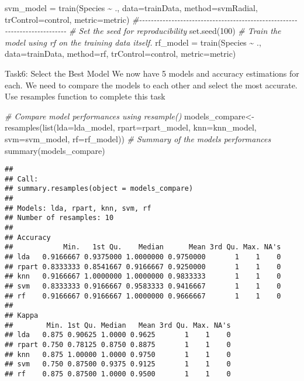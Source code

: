 \documentclass[
]{article}
\newenvironment{Shaded}{\begin{snugshade}}{\end{snugshade}}
\newcommand{\AttributeTok}[1]{\textcolor[rgb]{0.77,0.63,0.00}{#1}}
\newcommand{\CommentTok}[1]{\textcolor[rgb]{0.56,0.35,0.01}{\textit{#1}}}
\newcommand{\DecValTok}[1]{\textcolor[rgb]{0.00,0.00,0.81}{#1}}
\newcommand{\FunctionTok}[1]{\textcolor[rgb]{0.00,0.00,0.00}{#1}}
\newcommand{\NormalTok}[1]{#1}
\newcommand{\OtherTok}[1]{\textcolor[rgb]{0.56,0.35,0.01}{#1}}
\newcommand{\SpecialCharTok}[1]{\textcolor[rgb]{0.00,0.00,0.00}{#1}}
\newcommand{\StringTok}[1]{\textcolor[rgb]{0.31,0.60,0.02}{#1}}
\begin{document}
\begin{Shaded}
\begin{Highlighting}[]
\NormalTok{svm\_model }\OtherTok{=} \FunctionTok{train}\NormalTok{(Species }\SpecialCharTok{\textasciitilde{}}\NormalTok{ ., }\AttributeTok{data=}\NormalTok{trainData, }\AttributeTok{method=}\StringTok{\textquotesingle{}svmRadial\textquotesingle{}}\NormalTok{, }
\AttributeTok{trControl=}\NormalTok{control, }\AttributeTok{metric=}\NormalTok{metric)}
\CommentTok{\#{-}{-}{-}{-}{-}{-}{-}{-}{-}{-}{-}{-}{-}{-}{-}{-}{-}{-}{-}{-}{-}{-}{-}{-}{-}{-}{-}{-}{-}{-}{-}{-}{-}{-}{-}{-}{-}{-}{-}{-}{-}{-}{-}{-}{-}{-}{-}{-}{-}{-}{-}{-}{-}{-}{-}{-}{-}{-}{-}{-}{-}{-}{-}{-}{-}{-}{-}{-}{-}{-}{-}{-}{-}{-}{-}}
\CommentTok{\# Set the seed for reproducibility}
\FunctionTok{set.seed}\NormalTok{(}\DecValTok{100}\NormalTok{)}
\CommentTok{\# Train the model using rf on the training data itself.}
\NormalTok{rf\_model }\OtherTok{=} \FunctionTok{train}\NormalTok{(Species }\SpecialCharTok{\textasciitilde{}}\NormalTok{ ., }\AttributeTok{data=}\NormalTok{trainData, }\AttributeTok{method=}\StringTok{\textquotesingle{}rf\textquotesingle{}}\NormalTok{, }\AttributeTok{trControl=}\NormalTok{control, }
\AttributeTok{metric=}\NormalTok{metric)}
\end{Highlighting}
\end{Shaded}

Task6: Select the Best Model We now have 5 models and accuracy
estimations for each. We need to compare the models to each other and
select the most accurate. Use resamples function to complete this task

\begin{Shaded}
\begin{Highlighting}[]
\CommentTok{\# Compare model performances using resample()}
\NormalTok{models\_compare}\OtherTok{\textless{}{-}}\FunctionTok{resamples}\NormalTok{(}\FunctionTok{list}\NormalTok{(}\AttributeTok{lda=}\NormalTok{lda\_model, }\AttributeTok{rpart=}\NormalTok{rpart\_model, }
\AttributeTok{knn=}\NormalTok{knn\_model, }\AttributeTok{svm=}\NormalTok{svm\_model, }\AttributeTok{rf=}\NormalTok{rf\_model))}
\CommentTok{\# Summary of the models performances}
\FunctionTok{summary}\NormalTok{(models\_compare)}
\end{Highlighting}
\end{Shaded}

\begin{verbatim}
## 
## Call:
## summary.resamples(object = models_compare)
## 
## Models: lda, rpart, knn, svm, rf 
## Number of resamples: 10 
## 
## Accuracy 
##            Min.   1st Qu.    Median      Mean 3rd Qu. Max. NA's
## lda   0.9166667 0.9375000 1.0000000 0.9750000       1    1    0
## rpart 0.8333333 0.8541667 0.9166667 0.9250000       1    1    0
## knn   0.9166667 1.0000000 1.0000000 0.9833333       1    1    0
## svm   0.8333333 0.9166667 0.9583333 0.9416667       1    1    0
## rf    0.9166667 0.9166667 1.0000000 0.9666667       1    1    0
## 
## Kappa 
##        Min. 1st Qu. Median   Mean 3rd Qu. Max. NA's
## lda   0.875 0.90625 1.0000 0.9625       1    1    0
## rpart 0.750 0.78125 0.8750 0.8875       1    1    0
## knn   0.875 1.00000 1.0000 0.9750       1    1    0
## svm   0.750 0.87500 0.9375 0.9125       1    1    0
## rf    0.875 0.87500 1.0000 0.9500       1    1    0
\end{verbatim}
\end{document}
